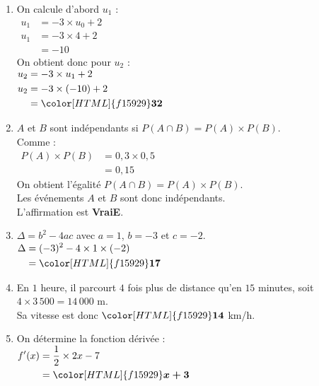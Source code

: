\documentclass[a4paper,11pt,landscape,exos]{nsi} %
\begin{document}
\begin{multicols}{2}
\begin{enumerate}[itemsep=1em]
    \item On calcule d'abord $u_1$ : \\   
          $\begin{aligned}
          u_1&=-3\times u_0 +2\\
          u_1&=-3\times 4 +2\\
          &=-10     
          \end{aligned}$\\
          On obtient donc pour $u_2$ :\\
          $\begin{aligned}
          u_2&=-3\times u_1 +2\\
          u_2&=-3\times (-10) +2\\
          &={\color[HTML]{f15929}\boldsymbol{32}}     
          \end{aligned}$
    \item $A$ et $B$ sont indépendants si $P(A\cap B)=P(A)\times P(B)$.\\
        Comme :\\$\begin{aligned}
        P(A)\times P(B)&=0{,}3\times 0{,}5\\
        &=0{,}15
        \end{aligned}$\\On obtient l'égalité  $P(A\cap B)=P(A)\times P(B)$.\\
        Les événements $A$ et $B$ sont donc indépendants.\\ L'affirmation est {\bfseries \color[HTML]{f15929}VraiE}.
    \vfill\null
    \columnbreak
    \item  $\Delta=b^2-4ac$ avec $a=1$, $b=-3$ et $c=-2$.\\
          $\begin{aligned}
          \Delta&=(-3)^2-4\times 1\times (-2) \\
          &={\color[HTML]{f15929}\boldsymbol{17}} 
          \end{aligned}$
    \item En $1$ heure, il parcourt $4$ fois plus de distance  qu'en $15$ minutes, soit $4\times 3\,500=
          14\,000$ m.\\
          Sa vitesse est donc ${\color[HTML]{f15929}\boldsymbol{14}}$ km/h.
    \item  On détermine la fonction dérivée :\\
          $\begin{aligned}
          f'(x)&=\dfrac{1}{2}\times 2x -7\\
          &={\color[HTML]{f15929}\boldsymbol{x+3}}     
          \end{aligned}$
      

\end{enumerate}
\end{multicols}
\end{document}
